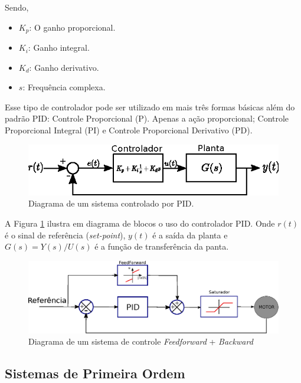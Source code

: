 Sendo,

\begin{itemize}
    \item $K_p$: O ganho proporcional.
    \item $K_i$: Ganho integral.
    \item $K_d$: Ganho derivativo.
    \item $s$: Frequência complexa.
\end{itemize}

Esse tipo de controlador pode ser utilizado em mais três formas básicas além do padrão PID: Controle Proporcional (P). Apenas a ação proporcional; Controle Proporcional Integral (PI) e Controle Proporcional Derivativo (PD).

\begin{figure}[H]
    \centering
    \includegraphics[width=\textwidth]{figuras/ilustracoes/diagrama_controlador_PID.eps}
    \caption{Diagrama de um sistema controlado por PID.}
    \label{fig:diagrama_controlador_PID}
\end{figure}

A Figura \ref{fig:diagrama_controlador_PID} ilustra em diagrama de blocos o uso do controlador PID. Onde $r(t)$ é o sinal de referência (\emph{set-point}), $y(t)$ é a saída da planta e $G(s) = Y(s)/U(s)$ é a função de transferência da panta.

\begin{figure}[H]
    \centering
    \includegraphics[width=\textwidth]{figuras/ilustracoes/sistema_de_controle_completo.eps}
    \caption{Diagrama de um sistema de controle \textit{Feedforward} + \textit{Backward}}
    \label{fig:diagrama_sistema_de_controle_feedforward_backward}
\end{figure}

\subsection{Sistemas de Primeira Ordem}

